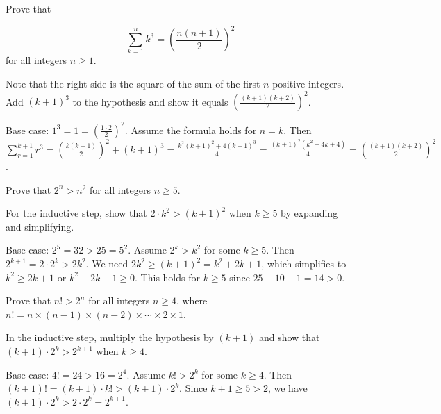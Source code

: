 \begin{problem}
Prove that 

$$\sum_{k=1}^{n} k^3 = \left(\frac{n(n+1)}{2}\right)^2$$ for all integers $n \ge 1$.

\end{problem}

\begin{hint}
Note that the right side is the square of the sum of the first $n$ positive integers. Add $(k+1)^3$ to the hypothesis and show it equals $\left(\frac{(k+1)(k+2)}{2}\right)^2$.
\end{hint}

\begin{solution}[Sketch]
Base case: $1^3 = 1 = \left(\frac{1 \cdot 2}{2}\right)^2$. Assume the formula holds for $n=k$. Then $\sum_{r=1}^{k+1} r^3 = \left(\frac{k(k+1)}{2}\right)^2 + (k+1)^3 = \frac{k^2(k+1)^2 + 4(k+1)^3}{4} = \frac{(k+1)^2(k^2+4k+4)}{4} = \left(\frac{(k+1)(k+2)}{2}\right)^2$.
\end{solution}

\begin{problem}
Prove that $2^n > n^2$ for all integers $n \ge 5$.
\end{problem}

\begin{hint}
For the inductive step, show that $2 \cdot k^2 > (k+1)^2$ when $k \ge 5$ by expanding and simplifying.
\end{hint}

\begin{solution}[Sketch]
Base case: $2^5 = 32 > 25 = 5^2$. Assume $2^k > k^2$ for some $k \ge 5$. Then $2^{k+1} = 2 \cdot 2^k > 2k^2$. We need $2k^2 \ge (k+1)^2 = k^2 + 2k + 1$, which simplifies to $k^2 \ge 2k + 1$ or $k^2 - 2k - 1 \ge 0$. This holds for $k \ge 5$ since $25 - 10 - 1 = 14 > 0$.
\end{solution}

\begin{problem}
Prove that $n! > 2^n$ for all integers $n \ge 4$,
where $n! = n \times (n-1) \times (n-2) \times \cdots \times 2 \times 1$.
\end{problem}

\begin{hint}
In the inductive step, multiply the hypothesis by $(k+1)$ and show that $(k+1) \cdot 2^k > 2^{k+1}$ when $k \ge 4$.
\end{hint}

\begin{solution}[Sketch]
Base case: $4! = 24 > 16 = 2^4$. Assume $k! > 2^k$ for some $k \ge 4$. Then $(k+1)! = (k+1) \cdot k! > (k+1) \cdot 2^k$. Since $k+1 \ge 5 > 2$, we have $(k+1) \cdot 2^k > 2 \cdot 2^k = 2^{k+1}$.
\end{solution}

